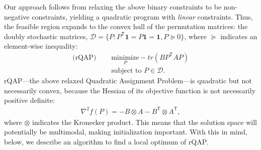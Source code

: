 \documentclass[11pt]{article}
\newcommand{\T}{^{\ensuremath{\mathsf{T}}}}           %
\providecommand{\mc}[1]{\mathcal{#1}}
\providecommand{\mb}[1]{\boldsymbol{#1}}
\begin{document}
Our approach follows from relaxing the above binary constraints
to be non-negative constraints, yielding a quadratic program with \emph{linear} constraints.  %
Thus, the feasible region expands to the convex hull of the permutation matrices: the doubly stochastic matrices, $\mc{D}=\{P : P\T \mb{1} =  P \mb{1} = \mb{1}, P \succeq 0\}$, where $\succeq$ indicates an element-wise inequality:
\begin{subequations} \label{eq:FAQ}
\begin{align}
		\text{(rQAP) } \quad &\underset{P}{\text{minimize}}   - tr(B P\T AP) \label{eq:FAQ1}  \\
		&\text{subject to }  P \in \mc{D}.
\end{align}
\end{subequations}
% 
rQAP---the above relaxed Quadratic Assignment Problem---is quadratic but not necessarily convex, 
because the Hessian of its objective function is not necessarily positive definite:
\begin{align}
	\nabla^2 f(P)  =  - B \otimes A - B\T \otimes A\T,
\end{align}
where $\otimes$ indicates the Kronecker product. This means that the solution space will potentially be multimodal, making initialization important.  With this in mind, below, we describe an algorithm to find a local optimum of rQAP.
\end{document}

